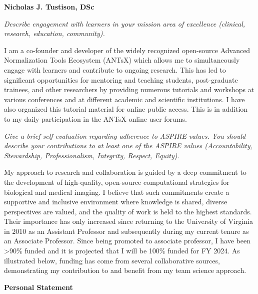 \documentclass[
  11pt,
]{article}
\author{}
\date{\vspace{-2.5em}}
\begin{document}

\textbf{Nicholas J. Tustison, DSc}

\emph{Describe engagement with learners in your mission area of
excellence (clinical, research, education, community).}

I am a co-founder and developer of the widely recognized open-source
Advanced Normalization Tools Ecosystem (ANTsX) which allows me to
simultaneously engage with learners and contribute to ongoing research.
This has led to significant opportunities for mentoring and teaching
students, post-graduate trainees, and other researchers by providing
numerous tutorials and workshops at various conferences and at different
academic and scientific institutions. I have also organized this
tutorial material for online public access. This is in addition to my
daily participation in the ANTsX online user forums.

\emph{Give a brief self-evaluation regarding adherence to ASPIRE values.
You should describe your contributions to at least one of the ASPIRE
values (Accountability, Stewardship, Professionalism, Integrity,
Respect, Equity).}

My approach to research and collaboration is guided by a deep commitment
to the development of high-quality, open-source computational strategies
for biological and medical imaging. I believe that such commitments
create a supportive and inclusive environment where knowledge is shared,
diverse perspectives are valued, and the quality of work is held to the
highest standards. Their importance has only increased since returning
to the University of Virginia in 2010 as an Assistant Professor and
subsequently during my current tenure as an Associate Professor. Since
being promoted to associate professor, I have been \textgreater90\%
funded and it is projected that I will be 100\% funded for FY 2024. As
illustrated below, funding has come from several collaborative sources,
demonstrating my contribution to and benefit from my team science
approach.

\textbf{Personal Statement}
\end{document}
